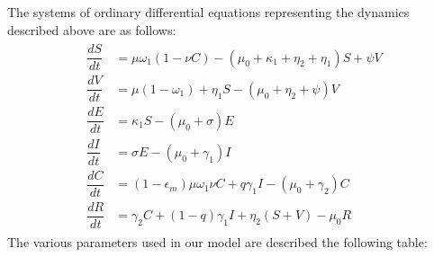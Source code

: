 The systems of ordinary differential equations representing the dynamics described above are as follows:
\begin{align}
\begin{split}
\dfrac{dS}{dt}&=\mu\omega_1(1-\nu C)-(\mu_0+\kappa_1+\eta_2+\eta_1)S+\psi V\\
\dfrac{dV}{dt}&=\mu(1-\omega_1)+\eta_1S-(\mu_0+\eta_2+\psi)V \\
\dfrac{dE}{dt}&=\kappa_1S-(\mu_0+\sigma)E \label{eqn: 1}\\
\dfrac{dI}{dt}&=\sigma E-(\mu_0+\gamma_1)I\\
\dfrac{dC}{dt}&=(1-\epsilon_m)\mu\omega_1\nu C+q\gamma_1I-(\mu_0+\gamma_2)C\\
\dfrac{dR}{dt}&=\gamma_2C+(1-q)\gamma_1I+\eta_2(S+V)-\mu_0R
\end{split}
\end{align}
The various parameters used in our model are described the following table:

